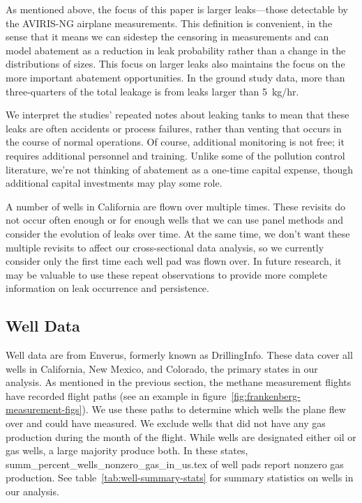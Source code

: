 \documentclass[12pt,oneside,letterpaper]{article}
\theoremstyle{definition}
\begin{document}
\begin{refsection}
As mentioned above, the focus of this paper is larger leaks---those detectable by the \gls{AVIRIS-NG} airplane measurements.
This definition is convenient, in the sense that it means we can sidestep the censoring in measurements and can model abatement as a reduction in leak probability rather than a change in the distributions of sizes.
This focus on larger leaks also maintains the focus on the more important abatement opportunities.
In the ground study data, more than three-quarters of the total leakage is from leaks larger than 5~kg/hr.


We interpret the studies' repeated notes about leaking tanks to mean that these leaks are often accidents or process failures, rather than venting that occurs in the course of normal operations.
Of course, additional monitoring is not free; it requires additional personnel and training.
Unlike some of the pollution control literature, we're not thinking of abatement as a one-time capital expense, though additional capital investments may play some role.


A number of wells in California are flown over multiple times.
These revisits do not occur often enough or for enough wells that we can use panel methods and consider the evolution of leaks over time.
At the same time, we don't want these multiple revisits to affect our cross-sectional data analysis, so we currently consider only the first time each well pad was flown over.
In future research, it may be valuable to use these repeat observations to provide more complete information on leak occurrence and persistence.


\subsection{Well Data}
\label{sec:well-data}
Well data are from Enverus, formerly known as DrillingInfo.
These data cover all wells in California, New Mexico, and Colorado, the primary states in our analysis.
As mentioned in the previous section, the methane measurement flights have recorded flight paths (see an example in figure~\ref{fig:frankenberg-measurement-figs}).
We use these paths to determine which wells the plane flew over and could have measured.
We exclude wells that did not have any gas production during the month of the flight.
While wells are designated either oil or gas wells, a large majority produce both.
In these states,
{summ_percent_wells_nonzero_gas_in_us.tex}
of well pads report nonzero gas production.
See table~\ref{tab:well-summary-stats} for summary statistics on wells in our analysis.



\end{refsection}
\end{document}
